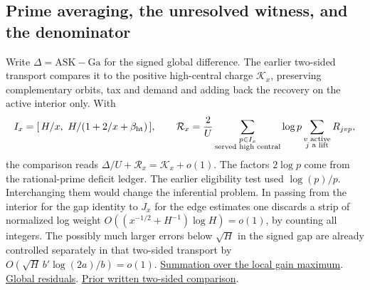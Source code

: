 \documentclass[12pt,letterpaper]{article}
\begin{document}
\subsection{Prime averaging, the unresolved witness, and the denominator}

Write \(\Delta=\mathrm{ASK}-\mathrm{Ga}\) for the signed global difference. The earlier two-sided transport compares it to the positive high-central charge \(\mathcal K_x\), preserving complementary orbits, tax and demand and adding back the recovery on the active interior only. With
\[
 I_x=[\,H/x,\ H/(1+2/x+\beta_{\rm ht})\,],\qquad
 \mathcal R_x=\frac{2}{U}\sum_{\substack{p\in I_x\\\text{served high central}}}
       \log p\sum_{\substack{v\text{ active}\\j\text{ a lift}}}R_{jvp},
\]
the comparison reads \(\Delta/U+\mathcal R_x=\mathcal K_x+o(1)\). The factors \(2\log p\) come from the rational-prime deficit ledger. The earlier eligibility test used \(\log(p)/p\). Interchanging them would change the inferential problem. In passing from the interior for the gap identity to \(J_x\) for the edge estimates one discards a strip of normalized log weight \(O((x^{-1/2}+H^{-1})\log H)=o(1)\), by counting all integers. The possibly much larger errors below \(\sqrt H\) in the signed gap are already controlled separately in that two-sided transport by \(O(\sqrt H\,b'\log(2a)/b)=o(1)\).
\href{https://github.com/nousentllc/riemann-hypothesis/blob/40e56bab026552e089d7afcfeff08d2defb9c005/src/Formalism/SharpRestriction/GrowthBounds/LogarithmicSums/NotSingularOfCentral.lean#L679-L728}{Summation over the local gain maximum}.
\href{https://github.com/nousentllc/riemann-hypothesis/blob/40e56bab026552e089d7afcfeff08d2defb9c005/src/Formalism/SizeWindowBrackets/ChainSlopeWindows/DiscriminantSettingSatisfied.lean#L162-L220}{Global residuals}.
\href{https://github.com/nousentllc/riemann-hypothesis/blob/3dedd2d81a54d046e3c12ef78df9d9fd0c2ad6dc/research/uriel/experiments/actual-gain-study/evidence/transport/TRANSPORT.md}{Prior written two-sided comparison}.
\end{document}

